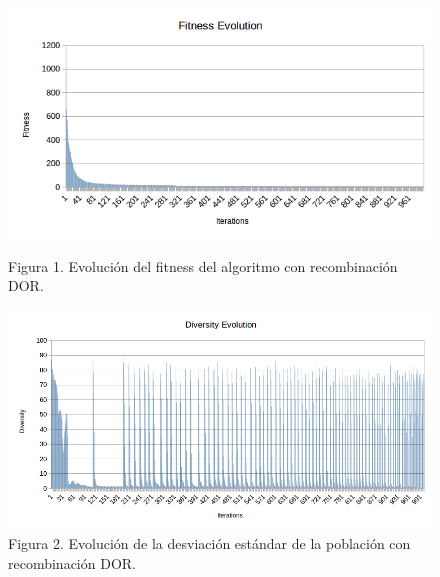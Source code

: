 \documentclass[10pt,journal,compsoc]{styles/IEEEtran}
\begin{document}
 \begin{figure}    
\begin{minipage}[t]{0.45\textwidth}
\includegraphics[width=\linewidth]{fitness1.png}
\caption{Figura 1. Evolución del fitness del algoritmo con recombinaci\'on DOR.}
\label{fig:immediate}
\end{minipage}
\hspace{\fill}
\begin{minipage}[t]{0.45\textwidth}
\includegraphics[width=\linewidth]{diversity1.png}
\caption{Figura 2. Evolución de la desviación estándar de la población con recombinaci\'on DOR.}
\label{fig:proximal}
\end{minipage}


\end{figure}
\end{document}
